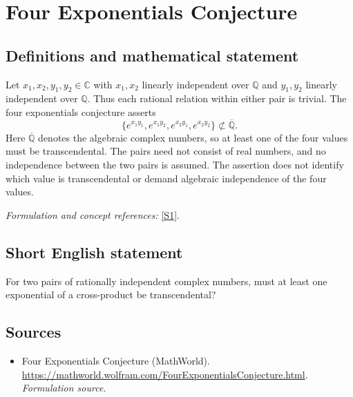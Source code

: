 \documentclass[11pt]{article}
\begin{document}
\section*{\texorpdfstring{Four Exponentials Conjecture}{Four Exponentials Conjecture}}\label{statement}
\subsection{Definitions and mathematical statement}
Let $x_1,x_2,y_1,y_2\in{\mathbb{C}}$ with $x_1,x_2$ linearly independent over ${\mathbb{Q}}$ and $y_1,y_2$ linearly independent over ${\mathbb{Q}}$. Thus each rational relation within either pair is trivial. The four exponentials conjecture asserts
\[
 \{e^{x_1y_1},e^{x_1y_2},e^{x_2y_1},e^{x_2y_2}\}
 \not\subset\overline{{\mathbb{Q}}}.
\]
Here $\overline{{\mathbb{Q}}}$ denotes the algebraic complex numbers, so at least one of the four values must be transcendental. The pairs need not consist of real numbers, and no independence between the two pairs is assumed. The assertion does not identify which value is transcendental or demand algebraic independence of the four values.
\par\smallskip\textit{Formulation and concept references:} \href{https://mathworld.wolfram.com/FourExponentialsConjecture.html}{[S1]}.

\subsection{Short English statement}
For two pairs of rationally independent complex numbers, must at least one exponential of a cross-product be transcendental?
\subsection{Sources}
\begin{itemize}
\item[S1]Four Exponentials Conjecture (MathWorld).
\url{https://mathworld.wolfram.com/FourExponentialsConjecture.html}.
\textit{Formulation source.}
\end{itemize}
\end{document}
